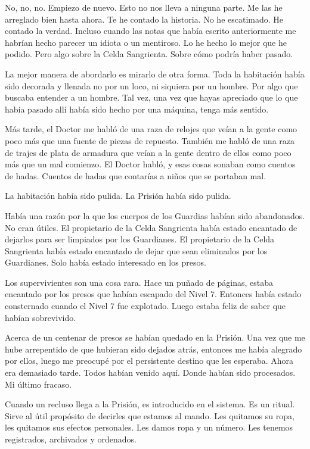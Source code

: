 No, no, no. Empiezo de nuevo. Esto no nos lleva a ninguna parte. Me las
he arreglado bien hasta ahora. Te he contado la historia. No he
escatimado. He contado la verdad. Incluso cuando las notas que había
escrito anteriormente me habrían hecho parecer un idiota o un mentiroso.
Lo he hecho lo mejor que he podido. Pero algo sobre la Celda Sangrienta.
Sobre cómo podría haber pasado.

La mejor manera de abordarlo es mirarlo de otra forma. Toda la
habitación había sido decorada y llenada no por un loco, ni siquiera por
un hombre. Por algo que buscaba entender a un hombre. Tal vez, una vez
que hayas apreciado que lo que había pasado allí había sido hecho por
una máquina, tenga más sentido.

Más tarde, el Doctor me habló de una raza de relojes que veían a la
gente como poco más que una fuente de piezas de repuesto. También me
habló de una raza de trajes de plata de armadura que veían a la gente
dentro de ellos como poco más que un mal comienzo. El Doctor habló, y
esas cosas sonaban como cuentos de hadas. Cuentos de hadas que contarías
a niños que se portaban mal.

La habitación había sido pulida. La Prisión había sido pulida.

Había una razón por la que los cuerpos de los Guardias habían sido
abandonados. No eran útiles. El propietario de la Celda Sangrienta había
estado encantado de dejarlos para ser limpiados por los Guardianes. El
propietario de la Celda Sangrienta había estado encantado de dejar que
sean eliminados por los Guardianes. Solo había estado interesado en los
presos.

Los supervivientes son una cosa rara. Hace un puñado de páginas, estaba
encantado por los presos que habían escapado del Nivel 7. Entonces había
estado consternado cuando el Nivel 7 fue explotado. Luego estaba feliz
de saber que habían sobrevivido.

Acerca de un centenar de presos se habían quedado en la Prisión. Una vez
que me hube arrepentido de que hubieran sido dejados atrás, entonces me
había alegrado por ellos, luego me preocupé por el persistente destino
que les esperaba. Ahora era demasiado tarde. Todos habían venido aquí.
Donde habían sido procesados. Mi último fracaso.

Cuando un recluso llega a la Prisión, es introducido en el sistema. Es
un ritual. Sirve al útil propósito de decirles que estamos al mando. Les
quitamos su ropa, les quitamos sus efectos personales. Les damos ropa y
un número. Les tenemos registrados, archivados y ordenados.

